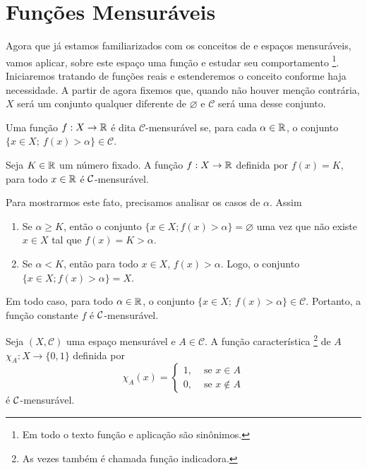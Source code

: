 \section{Funções Mensuráveis}


Agora que já estamos familiarizados com os conceitos de \sigal e espaços mensuráveis, vamos aplicar, sobre este espaço uma função e estudar seu comportamento
%
\footnote{Em todo o texto função e aplicação são sinônimos.}.
%
Iniciaremos tratando de funções reais e estenderemos o conceito conforme haja necessidade.
A partir de agora fixemos que, quando não houver menção contrária, $X$ será um conjunto qualquer diferente de $\varnothing$ e $\mathcal{C}$ será uma \sigal desse conjunto. 

\begin{definition}
	\label{def:mensurabilidade-funções-reais}
    Uma função $f: X \to \mathbb{R} $ é dita $\mathcal{C}$-mensurável se, para cada $\alpha \in \mathbb{R}$, o conjunto $\{x \in X;\ f(x) > \alpha\} \in \mathcal{C}$.
\end{definition}


\begin{example}
\label{ex:funcao-constante}
	Seja $K \in \mathbb{R}$ um número fixado. 
	A função $f: X \to \mathbb{R}$ definida por $f(x) = K$, para todo $x \in \mathbb{R}$  é $\operatorname{\mathcal{C}}$-mensurável.
\end{example}
Para mostrarmos este fato, precisamos analisar os casos de $\alpha$.
Assim
	\begin{enumerate}[label*= (\Roman*)]
		\item Se $\alpha \geq K$, então o conjunto $\{x \in X; f(x) > \alpha\} = \varnothing$ uma vez que não existe $x \in X$ tal que $f(x)= K > \alpha$.
		\item Se $\alpha < K$, então para todo $x \in X$, $f(x) > \alpha$.
		Logo, o conjunto $\{x \in X; f(x) > \alpha\} = X$.
	\end{enumerate}
Em todo caso, para todo $\alpha \in \mathbb{R}$, o conjunto  $\{x \in X;\ f(x) > \alpha\} \in \mathcal{C}$.
Portanto, a função constante $f$ é $\operatorname{\mathcal{C}}$-mensurável.

\begin{example}
    Seja $(X, \mathcal{C})$ uma espaço mensurável e $A \in \mathcal{C}$.
    A função característica \footnote{As vezes também é chamada  função indicadora.} de $A$ 
    $\chi_A: X \to \{0,1\}$ definida por 
    $$\chi_A(x) =\left\{\begin{array}{cc}
         1, & \textrm{\ se \ } x \in A \\
         0, & \textrm{\ se \ } x \notin A
    \end{array}\right.
    $$
    é $\operatorname{\mathcal{C}}$-mensurável.
\end{example}


